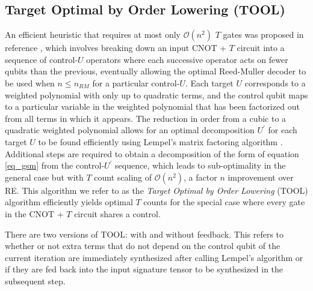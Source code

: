 \documentclass[notitlepage]{article}
\theoremstyle{definition}
\theoremstyle{problem}
\theoremstyle{lemma}
\begin{document}
\subsection{Target Optimal by Order Lowering (TOOL)}%
An efficient heuristic that requires at most only $\mathcal{O}(n^2)$ $T$ gates was proposed in reference \cite{4_Campbell_2017}, which involves breaking down an input CNOT + $T$ circuit into a sequence of control-$U$ operators where each successive operator acts on fewer qubits than the previous, eventually allowing the optimal Reed-Muller decoder to be used when $n\leq n_{RM}$ for a particular control-$U$. Each target $U$ corresponds to a weighted polynomial with only up to quadratic terms, and the control qubit maps to a particular variable in the weighted polynomial that has been factorized out from all terms in which it appears. The reduction in order from a cubic to a quadratic weighted polynomial allows for an optimal decomposition $U^\prime$ for each target $U$ to be found efficiently using Lempel's matrix factoring algorithm \cite{8_Lempel_1975}. Additional steps are required to obtain a decomposition of the form of equation \ref{eq_gsm} from the control-$U^\prime$ sequence, which leads to sub-optimality in the general case but with $T$ count scaling of $\mathcal{O}(n^2)$, a factor $n$ improvement over RE. This algorithm we refer to as the \emph{Target Optimal by Order Lowering} (TOOL) algorithm efficiently yields optimal $T$ counts for the special case where every gate in the CNOT + $T$ circuit shares a control.

There are two versions of TOOL: with and without feedback. This refers to whether or not extra terms that do not depend on the control qubit of the current iteration are immediately synthesized after calling Lempel's algorithm or if they are fed back into the input signature tensor to be synthesized in the subsequent step.
\end{document}
